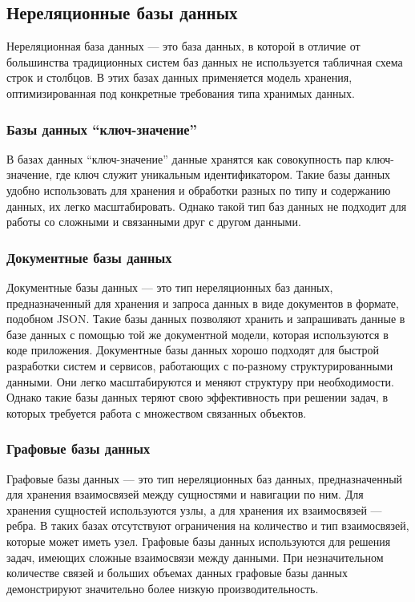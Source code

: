 \subsection{Нереляционные базы данных}

Нереляционная база данных --- это база данных, в которой в отличие от большинства традиционных систем баз данных не используется табличная схема строк и столбцов. В этих базах данных применяется модель хранения, оптимизированная под конкретные требования типа хранимых данных.

\subsubsection{Базы данных \enquote{ключ-значение}}

В базах данных \enquote{ключ-значение} данные хранятся как совокупность пар ключ-значение, где ключ служит уникальным идентификатором. Такие базы данных удобно использовать для хранения и обработки разных по типу и содержанию данных, их легко масштабировать. Однако такой тип баз данных не подходит для работы со сложными и связанными друг с другом данными.

\subsubsection{Документные базы данных}

Документные базы данных --- это тип нереляционных баз данных, предназначенный для хранения и запроса данных в виде документов в формате, подобном JSON. Такие базы данных позволяют хранить и запрашивать данные в базе данных с помощью той же документной модели, которая используются в коде приложения. Документные базы данных хорошо подходят для быстрой разработки систем и сервисов, работающих с по-разному структурированными данными. Они легко масштабируются и меняют структуру при необходимости. Однако такие базы данных теряют свою эффективность при решении задач, в которых требуется работа с множеством связанных объектов.

\subsubsection{Графовые базы данных}

Графовые базы данных --- это тип нереляционных баз данных, предназначенный для хранения взаимосвязей между сущностями и навигации по ним. Для хранения сущностей используются узлы, а для хранения их взаимосвязей --- ребра. В таких базах отсутствуют ограничения на количество и тип взаимосвязей, которые может иметь узел. Графовые базы данных используются для решения задач, имеющих сложные взаимосвязи между данными. При незначительном количестве связей и больших объемах данных графовые базы данных демонстрируют значительно более низкую производительность.

